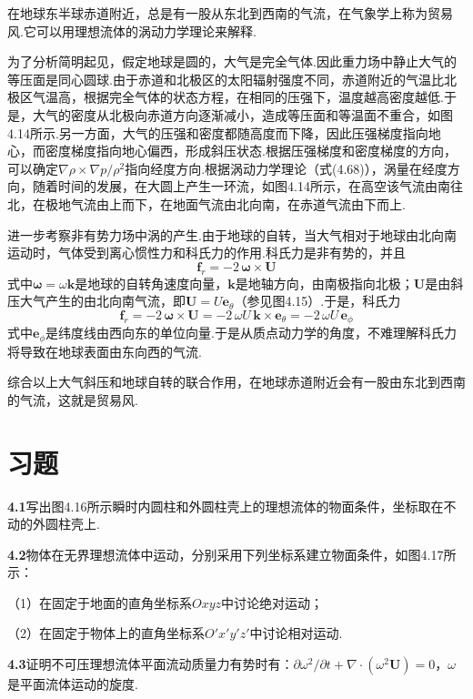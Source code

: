 在地球东半球赤道附近，总是有一股从东北到西南的气流，在气象学上称为贸易风.它可以用理想流体的涡动力学理论来解释.

为了分析简明起见，假定地球是圆的，大气是完全气体.因此重力场中静止大气的等压面是同心圆球.由于赤道和北极区的太阳辐射强度不同，赤道附近的气温比北极区气温高，根据完全气体的状态方程，在相同的压强下，温度越高密度越低.于是，大气的密度从北极向赤道方向逐渐减小，造成等压面和等温面不重合，如图4.14所示.另一方面，大气的压强和密度都随高度而下降，因此压强梯度指向地心，而密度梯度指向地心偏西，形成斜压状态.根据压强梯度和密度梯度的方向，可以确定$\nabla\rho\times\nabla p/\rho^{2}$指向经度方向.根据涡动力学理论（式(4.68)），涡量在经度方向，随着时间的发展，在大圆上产生一环流，如图4.14所示，在高空该气流由南往北，在极地气流由上而下，在地面气流由北向南，在赤道气流由下而上.

进一步考察非有势力场中涡的产生.由于地球的自转，当大气相对于地球由北向南运动时，气体受到离心惯性力和科氏力的作用.科氏力是非有势的，并且
\[
\boldsymbol{f}_r=-2\,\boldsymbol{\omega}\times\boldsymbol{U}
\]
式中$\boldsymbol{\omega}=\omega\boldsymbol{k}$是地球的自转角速度向量，$\boldsymbol{k}$是地轴方向，由南极指向北极；$\boldsymbol{U}$是由斜压大气产生的由北向南气流，即$\boldsymbol{U}=U\boldsymbol{e}_\theta$（参见图4.15）.于是，科氏力
\[
\boldsymbol{f}_r=-2\,\boldsymbol{\omega}\times\boldsymbol{U}=-2\,\omega U\,\boldsymbol{k}\times\boldsymbol{e}_\theta=-2\,\omega U\,\boldsymbol{e}_\phi
\]
式中$\boldsymbol{e}_\phi$是纬度线由西向东的单位向量.于是从质点动力学的角度，不难理解科氏力将导致在地球表面由东向西的气流.

综合以上大气斜压和地球自转的联合作用，在地球赤道附近会有一股由东北到西南的气流，这就是贸易风.

\section*{习题}

\noindent\textbf{4.1}\quad 写出图4.16所示瞬时内圆柱和外圆柱壳上的理想流体的物面条件，坐标取在不动的外圆柱壳上.

\noindent\textbf{4.2}\quad 物体在无界理想流体中运动，分别采用下列坐标系建立物面条件，如图4.17所示：

（1）在固定于地面的直角坐标系$Oxyz$中讨论绝对运动；

（2）在固定于物体上的直角坐标系$O'x'y'z'$中讨论相对运动.

\noindent\textbf{4.3}\quad 证明不可压理想流体平面流动质量力有势时有：$\partial\omega^{2}/\partial t+\nabla\cdot(\omega^{2}\boldsymbol{U})=0$，$\omega$是平面流体运动的旋度.

